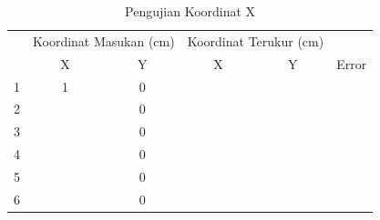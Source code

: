  \begin{table}[]
 	\caption{Pengujian Koordinat X}
 	\label{tbl.koordinatx}
 	\centering
 	\begin{tabular}{|c|c|c|c|c|c|}
 		\hline
 		\rowcolor[HTML]{9B9B9B} 
 		\cellcolor[HTML]{9B9B9B}                     & \multicolumn{2}{c|}{\cellcolor[HTML]{9B9B9B}Koordinat Masukan (cm)} & \multicolumn{2}{c|}{\cellcolor[HTML]{9B9B9B}Koordinat Terukur (cm)} & \cellcolor[HTML]{9B9B9B}                            \\ \cline{2-5}
 		\rowcolor[HTML]{9B9B9B} 
 		\multirow{-2}{*}{\cellcolor[HTML]{9B9B9B}No} & X                                & Y                                & X                                & Y                                & \multirow{-2}{*}{\cellcolor[HTML]{9B9B9B}Error} \\ \hline
 			1                                            & 1                                & 0                                &                                  &                                  &                                                     \\ \hline
 			2                                            &                                  & 0                                &                                  &                                  &                                                     \\ \hline
 			3                                            &                                  & 0                                &                                  &                                  &                                                     \\ \hline
 			4                                            &                                  & 0                                &                                  &                                  &                                                     \\ \hline
 			5                                            &                                  & 0                                &                                  &                                  &                                                     \\ \hline
 			6                                            &                                  & 0                                &                                  &                                  &                                                     \\ \hline

\end{tabular}
\end{table}
